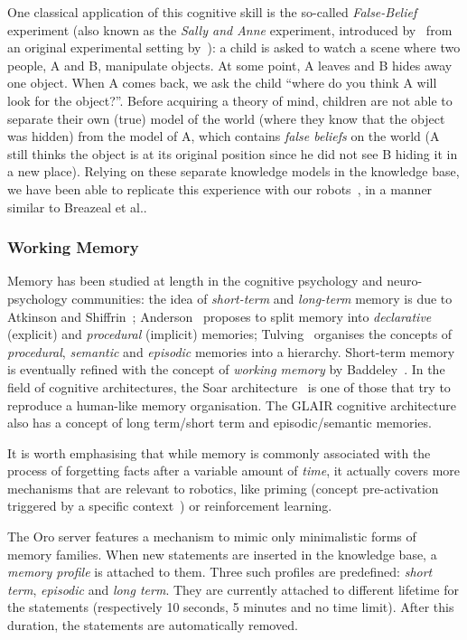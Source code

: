 \documentclass[preprint,3p,times]{elsarticle}
\newcommand{\etal}{et al.\xspace}
\begin{document}
One classical application of this cognitive skill is the so-called
\emph{False-Belief} experiment (also known as the \emph{Sally and Anne}
experiment, introduced by~\cite{wimmer1983beliefs} from an original
experimental setting by~\cite{baron1985does}): a child is asked to watch a scene where two
people, A and B, manipulate objects. At some point, A leaves and B hides away one
object. When A comes back, we ask the child ``where do you think A will
look for the object?''. Before acquiring a theory of mind, children are not
able to separate their own (true) model of the world (where they know that
the object was hidden) from the model of A, which contains \emph{false
beliefs} on the world (A still thinks the object is at its original
position since he did not see B hiding it in a new place). Relying on these separate knowledge models
in the knowledge base, we have been able to replicate this experience with
our robots~\cite{warnier2012when}, in a manner similar to Breazeal
\etal\cite{breazeal2009embodied}.

\subsubsection{Working Memory}
\label{memory}

Memory has been studied at length in the cognitive psychology and
neuro-psychology communities: the idea of \emph{short-term} and \emph{long-term}
memory is due to Atkinson and Shiffrin~\cite{Atkinson1968};
Anderson~\cite{Anderson1976} proposes to split memory into \emph{declarative}
(explicit) and \emph{procedural} (implicit) memories; Tulving~\cite{Tulving1985}
organises the concepts of \emph{procedural}, \emph{semantic} and \emph{episodic}
memories into a hierarchy. Short-term memory is eventually refined with the
concept of \emph{working memory} by Baddeley~\cite{Baddeley2010}.  In the field
of cognitive architectures, the {\sc Soar} architecture~\cite{Lehman2006} is one
of those that try to reproduce a human-like memory organisation. The GLAIR
cognitive architecture~\cite{Shapiro2009} also has a concept of long term/short
term and episodic/semantic memories.

It is worth emphasising that while memory is commonly associated with the process of
forgetting facts after a variable amount of \emph{time}, it actually covers
more mechanisms that are relevant to robotics, like priming
(concept pre-activation triggered by a specific
context~\cite{baxter2012modelling}) or reinforcement learning.

The {\sc Oro} server features a mechanism to mimic only minimalistic forms of memory
families.  When new statements are inserted in the knowledge base, a
\emph{memory profile} is attached to them.  Three such profiles are
predefined: {\it short term}, {\it episodic} and {\it long term}. They are
currently attached to different lifetime for the statements (respectively 10
seconds, 5 minutes and no time limit). After this duration, the statements are
automatically removed.
\end{document}
